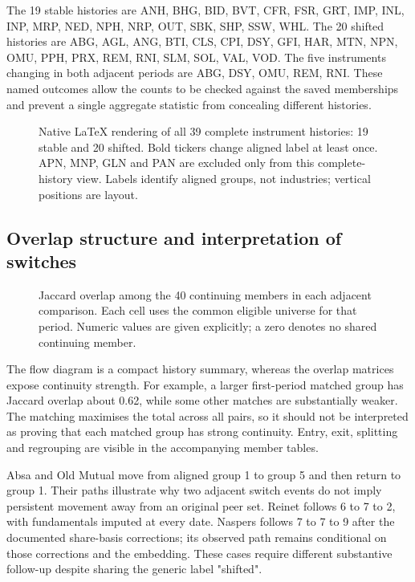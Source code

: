 The 19 stable histories are ANH, BHG, BID, BVT, CFR, FSR, GRT, IMP, INL, INP, MRP, NED, NPH, NRP, OUT, SBK, SHP, SSW, WHL. The 20 shifted histories are ABG, AGL, ANG, BTI, CLS, CPI, DSY, GFI, HAR, MTN, NPN, OMU, PPH, PRX, REM, RNI, SLM, SOL, VAL, VOD. The five instruments changing in both adjacent periods are ABG, DSY, OMU, REM, RNI. These named outcomes allow the counts to be checked against the saved memberships and prevent a single aggregate statistic from concealing different histories.



\begin{figure}[htbp]
\centering
{}
\caption{Native LaTeX rendering of all 39 complete instrument histories: 19 stable and 20 shifted. Bold tickers change aligned label at least once. APN, MNP, GLN and PAN are excluded only from this complete-history view. Labels identify aligned groups, not industries; vertical positions are layout.}\label{fig:flows}
\end{figure}


\subsection{Overlap structure and interpretation of switches}


\begin{figure}[htbp]
\centering
{}
\caption{Jaccard overlap among the 40 continuing members in each adjacent comparison. Each cell uses the common eligible universe for that period. Numeric values are given explicitly; a zero denotes no shared continuing member.}\label{fig:jaccard}
\end{figure}


The flow diagram is a compact history summary, whereas the overlap matrices expose continuity strength. For example, a larger first-period matched group has Jaccard overlap about 0.62, while some other matches are substantially weaker. The matching maximises the total across all pairs, so it should not be interpreted as proving that each matched group has strong continuity. Entry, exit, splitting and regrouping are visible in the accompanying member tables.


Absa and Old Mutual move from aligned group 1 to group 5 and then return to group 1. Their paths illustrate why two adjacent switch events do not imply persistent movement away from an original peer set. Reinet follows 6 to 7 to 2, with fundamentals imputed at every date. Naspers follows 7 to 7 to 9 after the documented share-basis corrections; its observed path remains conditional on those corrections and the embedding. These cases require different substantive follow-up despite sharing the generic label "shifted".


